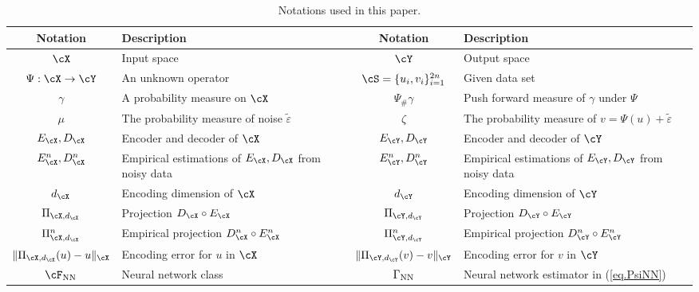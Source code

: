 \documentclass[11pt]{article} %
\begin{document}
\begin{table}[t!]\footnotesize
	\centering
	\begin{tabular}{c|l||c|l}
		\hline\hline
		Notation & Description & Notation & Description \\
		\hline
		$\cX$ &Input space & $\cY$  & Output space\\
		\hline
		$\Psi: \cX \rightarrow \cY$ & An unknown operator & $ \cS=\{u_i,v_i\}_{i=1}^{2n}$ & Given data set\\
		\hline
		$\gamma$ & A probability measure on $\cX$ & $\Psi_{\#}\gamma$  & \makecell[l]{Push forward measure of $\gamma$\\ under $\Psi$} \\
		\hline
		$\mu$ &  The probability measure of noise $\widetilde{\varepsilon}$ & $\zeta$ & The probability measure of $v=\Psi(u)+\widetilde{\varepsilon}$\\
		\hline
		$E_{\cX},D_{\cX}$ & Encoder and decoder of $\cX$ & $E_{\cY},D_{\cY}$ & Encoder and decoder of $\cY$\\
		\hline
		$E_{\cX}^n,D_{\cX}^n$ & \makecell[l]{Empirical estimations of  $E_{\cX},D_{\cX}$ \\ from noisy data} & $E_{\cY}^n,D_{\cY}^n$ & \makecell[l]{Empirical estimations of  $E_{\cY},D_{\cY}$ \\ from noisy data}\\
		\hline
		$d_{\cX}$ & Encoding dimension of $\cX$ & $d_{\cY}$ & Encoding dimension of $\cY$	\\
		\hline
		$\Pi_{\cX, d_{\cX}}$ & Projection $D_{\cX}\circ E_{\cX}$ & $\Pi_{\cY, d_{\cY}}$ & Projection $D_{\cY}\circ E_{\cY}$ \\
		\hline
		$\Pi_{\cX, d_{\cX}}^n$ & Empirical projection $D_{\cX}^n\circ E_{\cX}^n$& $\Pi_{\cY, d_{\cY}}^n$ & Empirical projection $D_{\cY}^n\circ E_{\cY}^n$\\
		\hline
		$\|\Pi_{\cX, d_{\cX}}(u)-u\|_{\cX}$ & Encoding error for $u$ in $\cX$ & $\|\Pi_{\cY, d_{\cY}}(v)-v\|_{\cY}$ & Encoding error for $v$ in $\cY$\\
		\hline
		$\cF_{\rm NN}$ & Neural network class &  $\Gamma_{\rm NN}$ & Neural network estimator in (\ref{eq.PsiNN})\\
		\hline\hline
	\end{tabular}
	\caption{Notations used in this paper. }\label{tab.notation}
\end{table}
\end{document}
